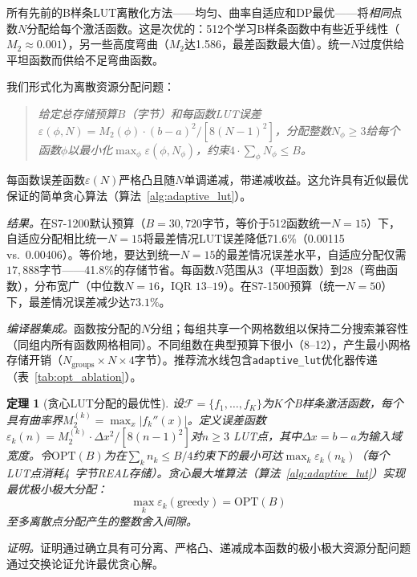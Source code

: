 \documentclass[journal,onecolumn]{IEEEtran}
\theoremstyle{definition}
\theoremstyle{plain}
\newtheorem{theorem}{定理}
\theoremstyle{remark}
\begin{document}
所有先前的B样条LUT离散化方法——均匀、曲率自适应和DP最优——将\textit{相同}点数$N$分配给每个激活函数。这是次优的：512个学习B样条函数中有些近乎线性（$M_2 \approx 0.001$），另一些高度弯曲（$M_2$达1.586，最差函数最大值）。统一$N$过度供给平坦函数而供给不足弯曲函数。

我们形式化为离散资源分配问题：
\begin{quote}
\textit{给定总存储预算$B$（字节）和每函数LUT误差$\varepsilon(\phi, N) = M_2(\phi) \cdot (b-a)^2 / [8(N-1)^2]$，分配整数$N_{\phi} \geq 3$给每个函数$\phi$以最小化$\max_{\phi} \varepsilon(\phi, N_{\phi})$，约束$4 \cdot \sum_{\phi} N_{\phi} \leq B$。}
\end{quote}

每函数误差函数$\varepsilon(N)$严格凸且随$N$单调递减，带递减收益。这允许具有近似最优保证的简单贪心算法（算法~\ref{alg:adaptive_lut}）。

\textit{结果。}在S7-1200默认预算（$B=30{,}720$字节，等价于512函数统一$N=15$）下，自适应分配相比统一$N=15$将最差情况LUT误差降低71.6\%（0.00115 vs.\ 0.00406）。等价地，要达到统一$N=15$的最差情况误差水平，自适应分配仅需$17{,}888$字节——41.8\%的存储节省。每函数$N$范围从$3$（平坦函数）到$28$（弯曲函数），分布宽广（中位数$N=16$，IQR $13$--$19$）。在S7-1500预算（统一$N=50$）下，最差情况误差减少达$73.1\%$。

\textit{编译器集成。}函数按分配的$N$分组；每组共享一个网格数组以保持二分搜索兼容性（同组内所有函数网格相同）。不同组数在典型预算下很小（8--12），产生最小网格存储开销（$N_{\text{groups}} \times N \times 4$字节）。推荐流水线包含\texttt{adaptive\_lut}优化器传递（表~\ref{tab:opt_ablation}）。

\begin{theorem}[贪心LUT分配的最优性]
\label{thm:greedy}
设$\mathcal{F} = \{f_1, \ldots, f_K\}$为$K$个B样条激活函数，每个具有曲率界$M_2^{(k)} = \max_x |f_k''(x)|$。定义误差函数$\varepsilon_k(n) = M_2^{(k)} \cdot \Delta x^2 / [8(n-1)^2]$对$n \geq 3$ LUT点，其中$\Delta x = b-a$为输入域宽度。令$\text{OPT}(B)$为在$\sum_k n_k \leq B/4$约束下的最小可达$\max_k \varepsilon_k(n_k)$（每个LUT点消耗4~字节REAL存储）。贪心最大堆算法（算法~\ref{alg:adaptive_lut}）实现最优极小极大分配：
\begin{equation}
\max_k \varepsilon_k(\text{greedy}) = \text{OPT}(B)
\label{eq:greedy_optimal}
\end{equation}
至多离散点分配产生的整数舍入间隙。
\end{theorem}

\noindent\textit{证明。}证明通过确立具有可分离、严格凸、递减成本函数的极小极大资源分配问题通过交换论证允许最优贪心解。
\end{document}

